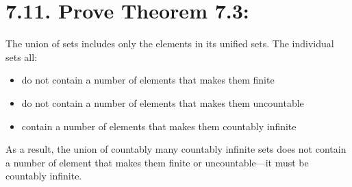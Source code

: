 \documentclass{article}
\begin{document}
\section*{7.11. Prove Theorem 7.3:}
The union of sets includes only the elements in its unified sets. The individual sets all:
\begin{itemize}
\item do not contain a number of elements that makes them finite
\item do not contain a number of elements that makes them uncountable
\item contain a number of elements that makes them countably infinite
\end{itemize}
As a result, the union of countably many countably infinite sets does not contain a number of element that makes them finite or uncountable---it must be countably infinite.
\end{document}
